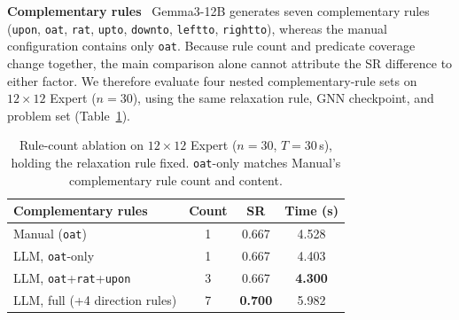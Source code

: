 \documentclass{ieeeaccess}
\newcommand{\tref}[1]{Table~\ref{#1}}
\newcommand{\myparagraph}[1]{\noindent\textbf{#1}~}
\begin{document}
\begin{table}[t]
    \centering
    \caption{Relaxation rule preconditions generated by each model vs.\ the manual baseline.
    Gemma3-12B (the primary model) produces an exact match; others deviate.}
    \label{tab:rule_diff}
\end{table}

\myparagraph{Complementary rules}
Gemma3-12B generates seven complementary rules (\texttt{upon}, \texttt{oat}, \texttt{rat}, \texttt{upto}, \texttt{downto}, \texttt{leftto}, \texttt{rightto}), whereas the manual configuration contains only \texttt{oat}.
Because rule count and predicate coverage change together, the main comparison alone cannot attribute the SR difference to either factor.
We therefore evaluate four nested complementary-rule sets on $12{\times}12$ Expert ($n{=}30$), using the same relaxation rule, GNN checkpoint, and problem set (\tref{tab:rulecount}).

\begin{table}[t]
    \centering
    \caption{Rule-count ablation on $12{\times}12$ Expert ($n{=}30$, $T{=}30$\,s), holding the relaxation rule fixed. \texttt{oat}-only matches Manual's complementary rule count and content.}
    \label{tab:rulecount}
    \small
    \setlength{\tabcolsep}{4pt}
    \renewcommand{\arraystretch}{1.1}
    \begin{tabular}{lccc}
        \toprule
        \textbf{Complementary rules} & \textbf{Count} & \textbf{SR} & \textbf{Time (s)} \\
        \midrule
        Manual (\texttt{oat})                          & 1 & 0.667          & 4.528 \\
        LLM, \texttt{oat}-only                         & 1 & 0.667          & 4.403 \\
        LLM, \texttt{oat}+\texttt{rat}+\texttt{upon}    & 3 & 0.667          & \textbf{4.300} \\
        LLM, full (+4 direction rules)                 & 7 & \textbf{0.700} & 5.982 \\
        \bottomrule
    \end{tabular}
\end{table}
\end{document}
